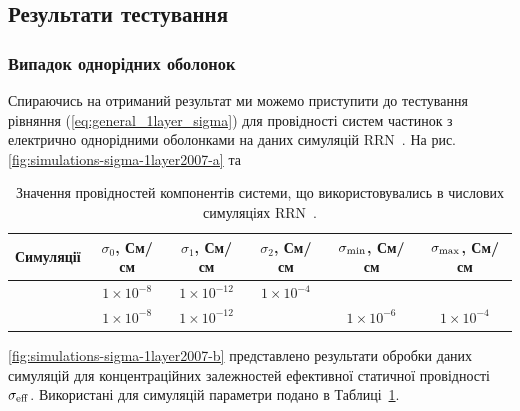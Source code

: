 \documentclass[14pt,twoside]{vakthesis}
\begin{document}
\subsection{Результати тестування}
\subsubsection{Випадок однорідних оболонок}

Спираючись на отриманий результат ми можемо приступити до тестування 
рівняння (\ref{eq:general_1layer_sigma}) для провідності
систем частинок з електрично однорідними оболонками на даних симуляцій 
RRN~\cite{Siekierski2007}. 
На рис. \ref{fig:simulations-sigma-1layer2007-a} та
\begin{table}[!b]
	\begin{center}%
		\caption{\label{tab:RRN-exper-params} Значення провідностей компонентів системи, що використовувались в числових симуляціях RRN~\cite{Siekierski2005, Siekierski2006, Siekierski2007}.}
		\begin{tabular}{|l|c|c|c|c|c|}
			\hline
			Симуляції  & $\sigma_0$, См/см & $\sigma_1$, См/см & $\sigma_2$, См/см & $\sigma_{\rm min}$, См/см & $\sigma_{\rm max}$, См/см \\
			\hline
			\cite{Siekierski2005,Siekierski2007}  & $1\times 10^{-8}$ & $1\times 10^{-12}$ & $1\times 10^{-4}$     & & \\
			\hline
			\cite{Siekierski2006}  & $1\times 10^{-8}$ & $1\times 10^{-12}$ &   & $1\times 10^{-6}$ & $1\times 10^{-4}$\\
			\hline
		\end{tabular}
	\end{center}
\end{table}
\ref{fig:simulations-sigma-1layer2007-b} представлено результати обробки даних симуляцій \cite{Siekierski2007} для концентраційних залежностей ефективної статичної провідності $\sigma_{\rm eff}$. Використані  для симуляцій параметри подано в Таблиці~\ref{tab:RRN-exper-params}. 
\end{document}
